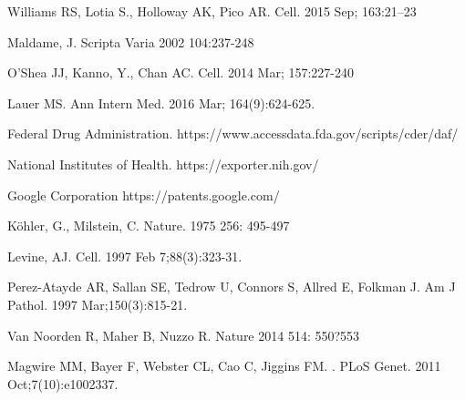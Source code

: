 \documentclass[10pt,letterpaper]{article}
\begin{document}
\begin{thebibliography}{10}

Williams RS, Lotia S., Holloway AK, Pico AR.
\newblock Cell. 2015 Sep; 163:21--23

Maldame, J.
\newblock Scripta Varia 2002 104:237-248

O'Shea JJ, Kanno, Y., Chan AC.
\newblock Cell. 2014 Mar; 157:227-240

Lauer MS.
\newblock Ann Intern Med. 2016 Mar; 164(9):624-625.

Federal Drug Administration.
\newblock https://www.accessdata.fda.gov/scripts/cder/daf/

National Institutes of Health.
\newblock https://exporter.nih.gov/

Google Corporation
\newblock https://patents.google.com/

K\"ohler, G., Milstein, C.
\newblock Nature. 1975 256: 495-497

Levine, AJ.
\newblock Cell. 1997 Feb 7;88(3):323-31.

Perez-Atayde AR, Sallan SE, Tedrow U, Connors S, Allred E, Folkman J.
\newblock Am J Pathol. 1997 Mar;150(3):815-21.

Van Noorden R, Maher B, Nuzzo R.
\newblock Nature 2014 514: 550?553 

Magwire MM, Bayer F, Webster CL, Cao C, Jiggins FM.
.
\newblock PLoS Genet. 2011 Oct;7(10):e1002337.
\end{thebibliography}
\end{document}
